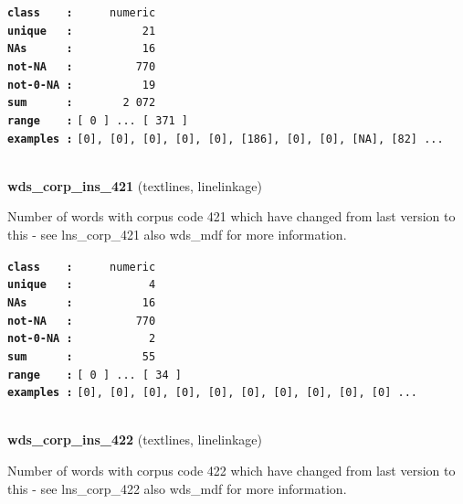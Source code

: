 \documentclass[]{article}
\begin{document}
\textbf{\texttt{class\ \ \ \ :}} \texttt{~~~~~numeric}\\
\textbf{\texttt{unique\ \ \ :}} \texttt{~~~~~~~~~~21}\\
\textbf{\texttt{NAs\ \ \ \ \ \ :}} \texttt{~~~~~~~~~~16}\\
\textbf{\texttt{not-NA\ \ \ :}} \texttt{~~~~~~~~~770}\\
\textbf{\texttt{not-0-NA\ :}} \texttt{~~~~~~~~~~19}\\
\textbf{\texttt{sum\ \ \ \ \ \ :}} \texttt{~~~~~~~2~072}\\
\textbf{\texttt{range\ \ \ \ :}}
\texttt{{[}\ 0\ {]}\ ...\ {[}\ 371\ {]}}\\
\textbf{\texttt{examples\ :}}
\texttt{{[}0{]},\ {[}0{]},\ {[}0{]},\ {[}0{]},\ {[}0{]},\ {[}186{]},\ {[}0{]},\ {[}0{]},\ {[}NA{]},\ {[}82{]}\ ...}\\

~

\textbf{wds\_corp\_ins\_421} (textlines, linelinkage)

Number of words with corpus code 421 which have changed from last
version to this - see lns\_corp\_421 also wds\_mdf for more information.

\textbf{\texttt{class\ \ \ \ :}} \texttt{~~~~~numeric}\\
\textbf{\texttt{unique\ \ \ :}} \texttt{~~~~~~~~~~~4}\\
\textbf{\texttt{NAs\ \ \ \ \ \ :}} \texttt{~~~~~~~~~~16}\\
\textbf{\texttt{not-NA\ \ \ :}} \texttt{~~~~~~~~~770}\\
\textbf{\texttt{not-0-NA\ :}} \texttt{~~~~~~~~~~~2}\\
\textbf{\texttt{sum\ \ \ \ \ \ :}} \texttt{~~~~~~~~~~55}\\
\textbf{\texttt{range\ \ \ \ :}}
\texttt{{[}\ 0\ {]}\ ...\ {[}\ 34\ {]}}\\
\textbf{\texttt{examples\ :}}
\texttt{{[}0{]},\ {[}0{]},\ {[}0{]},\ {[}0{]},\ {[}0{]},\ {[}0{]},\ {[}0{]},\ {[}0{]},\ {[}0{]},\ {[}0{]}\ ...}\\

~

\textbf{wds\_corp\_ins\_422} (textlines, linelinkage)

Number of words with corpus code 422 which have changed from last
version to this - see lns\_corp\_422 also wds\_mdf for more information.
\end{document}

